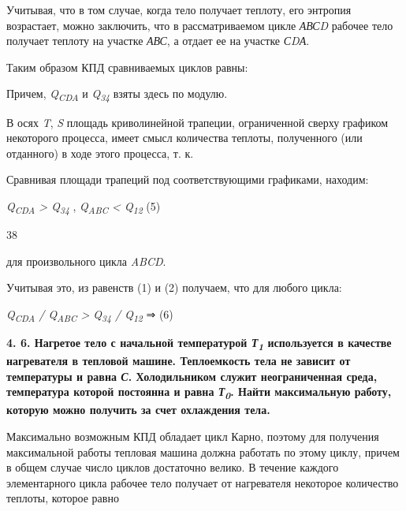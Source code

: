 Учитывая, что в том случае, когда тело получает теплоту, его энтропия
возрастает, можно заключить, что в рассматриваемом цикле \emph{АВСD}
рабочее тело получает теплоту на участке \emph{АВС}, а отдает ее на
участке \emph{СDА}.

Таким образом КПД сравниваемых циклов равны:




Причем, \emph{Q\textsubscript{CDA}} и \emph{Q\textsubscript{34}} взяты
здесь по модулю.

В осях \emph{T}, \emph{S} площадь криволинейной трапеции, ограниченной
сверху графиком некоторого процесса, имеет смысл количества теплоты,
полученного (или отданного) в ходе этого процесса, т. к.


Сравнивая площади трапеций под соответствующими графиками, находим:

\emph{Q\textsubscript{CDA} \textgreater{} Q\textsubscript{34}} ,
\emph{Q\textsubscript{ABC} \textless{} Q\textsubscript{12}} (5)

38

для произвольного цикла \emph{ABCD}.

Учитывая это, из равенств (1) и (2) получаем, что для любого цикла:

\emph{Q\textsubscript{CDA} / Q\textsubscript{ABC} \textgreater{}
Q\textsubscript{34} / Q\textsubscript{12}} ⇒
(6)

\textbf{4. 6. Нагретое тело с начальной температурой
\emph{Т\textsubscript{1}} используется в качестве нагревателя в тепловой
машине. Теплоемкость тела не зависит от температуры и равна \emph{С}.
Холодильником служит неограниченная среда, температура которой постоянна
и равна \emph{Т\textsubscript{0}}. Найти максимальную работу, которую
можно получить за счет охлаждения тела.}

\solving{}

Максимально возможным КПД обладает цикл Карно, поэтому для получения
максимальной работы тепловая машина должна работать по этому циклу,
причем в общем случае число циклов достаточно велико. В течение каждого
элементарного цикла рабочее тело получает от нагревателя некоторое
количество теплоты, которое равно

